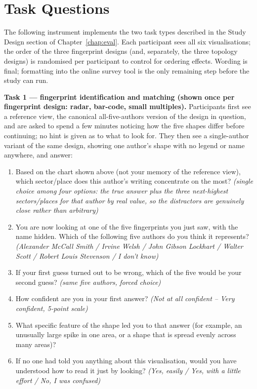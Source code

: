 \documentclass[logo,msc]{infthesis}
\begin{document}
\section{Task Questions}
\label{app:questionnaire}

The following instrument implements the two task types described in the Study Design section of Chapter~\ref{chap:eval}. Each participant sees all six visualisations; the order of the three fingerprint designs (and, separately, the three topology designs) is randomised per participant to control for ordering effects. Wording is final; formatting into the online survey tool is the only remaining step before the study can run.

\textbf{Task 1 --- fingerprint identification and matching (shown once per fingerprint design: radar, bar-code, small multiples).} Participants first see a reference view, the canonical all-five-authors version of the design in question, and are asked to spend a few minutes noticing how the five shapes differ before continuing; no hint is given as to what to look for. They then see a single-author variant of the same design, showing one author's shape with no legend or name anywhere, and answer:
\begin{enumerate}
  \item Based on the chart shown above (not your memory of the reference view), which sector/place does this author's writing concentrate on the most? \emph{(single choice among four options: the true answer plus the three next-highest sectors/places for that author by real value, so the distractors are genuinely close rather than arbitrary)}
  \item You are now looking at one of the five fingerprints you just saw, with the name hidden. Which of the following five authors do you think it represents? \emph{(Alexander McCall Smith / Irvine Welsh / John Gibson Lockhart / Walter Scott / Robert Louis Stevenson / I don't know)}
  \item If your first guess turned out to be wrong, which of the five would be your second guess? \emph{(same five authors, forced choice)}
  \item How confident are you in your first answer? \emph{(Not at all confident -- Very confident, 5-point scale)}
  \item What specific feature of the shape led you to that answer (for example, an unusually large spike in one area, or a shape that is spread evenly across many areas)?
  \item If no one had told you anything about this visualisation, would you have understood how to read it just by looking? \emph{(Yes, easily / Yes, with a little effort / No, I was confused)}
\end{enumerate}
\end{document}
